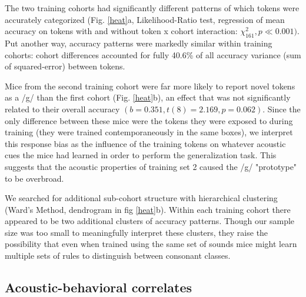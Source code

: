 \documentclass[11pt]{article}\usepackage[]{graphicx}\usepackage[]{color}
\begin{document}
The two training cohorts had significantly different patterns of which tokens were accurately categorized (Fig. \ref{heat}a, Likelihood-Ratio test, regression of mean accuracy on tokens with and without token x cohort interaction: $\chi^2_{161}, p \ll 0.001)$. Put another way, accuracy patterns were markedly similar within training cohorts: cohort differences accounted for fully 40.6\% of all accuracy variance (sum of squared-error) between tokens.

Mice from the second training cohort were far more likely to report novel tokens as a /g/ than the first cohort (Fig. \ref{heat}b), an effect that was not significantly related to their overall accuracy $(b=0.351, t(8)=2.169, p=0.062 )$. Since the only difference between these mice were the tokens they were exposed to during training (they were trained contemporaneously in the same boxes),  we interpret this response bias as the influence of the training tokens on whatever acoustic cues the mice had learned in order to perform the generalization task. This suggests that the acoustic properties of training set 2 caused the /g/ "prototype" to be overbroad.

We searched for additional sub-cohort structure with hierarchical clustering (Ward's Method, dendrogram in fig \ref{heat}b). Within each training cohort there appeared to be two additional clusters of accuracy patterns. Though our sample size was too small to meaningfully interpret these clusters, they raise the possibility that even when trained using the same set of sounds mice might learn multiple sets of rules to distinguish between consonant classes.


%
%
%
\subsection{Acoustic-behavioral correlates}
\end{document}
